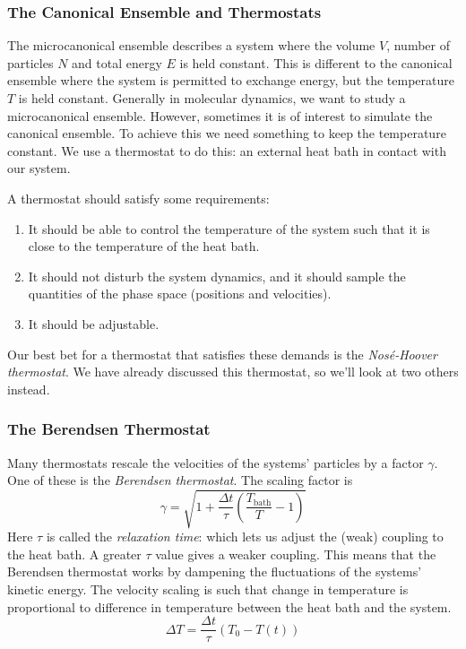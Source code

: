 \documentclass[11pt]{article}
\numberwithin{equation}{section}
\numberwithin{figure}{section}
\newcommand{\ita}[1]{\textit{#1}}
\begin{document}
\subsubsection{The Canonical Ensemble and Thermostats}
The microcanonical ensemble describes a system where the
volume $V$, number of particles $N$ and total energy $E$ is held constant.
This is different to the canonical ensemble where the system is permitted
to exchange energy, but the temperature $T$ is held constant.
Generally in molecular dynamics, we want to study a microcanonical ensemble.
However, sometimes it is of interest to simulate the canonical ensemble.
To achieve this we need something to keep the temperature constant.
We use a thermostat to do this: an external heat 
bath in contact with our system.

A thermostat should satisfy some requirements:
\begin{enumerate}
    \item It should be able to control the temperature of the system
        such that it is close to the temperature of the heat bath.
    \item It should not disturb the system dynamics, and it should
        sample the quantities of the phase space (positions and velocities).
    \item It should be adjustable.
\end{enumerate}

Our best bet for a thermostat that satisfies these demands is the
\ita{Nosé-Hoover thermostat}.
We have already discussed this thermostat, so we'll look at
two others instead.

\subsubsection{The Berendsen Thermostat}
Many thermostats rescale the velocities of the systems' particles
by a factor $\gamma$. One of these is the \ita{Berendsen thermostat}.
The scaling factor is
\begin{equation}
    \gamma = \sqrt{1+\frac{\Delta t}{\tau}\left(
            \frac{T_{\text{bath}}}{T} - 1    
        \right)}
\end{equation}
Here $\tau$ is called the \ita{relaxation time}: which lets us
adjust the (weak) coupling to the heat bath. A greater $\tau$ value gives
a weaker coupling.
This means that the Berendsen thermostat works by dampening the
fluctuations of the systems' kinetic energy.
The velocity scaling is such that change in temperature is proportional
to difference in temperature between the heat bath and the system.
\begin{equation}
    \Delta T = \frac{\Delta t}{\tau}(T_0 - T(t))
\end{equation}
\end{document}
